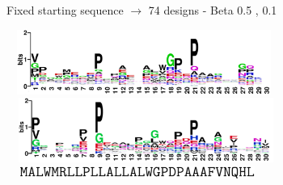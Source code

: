 \documentclass{beamer}
\begin{document}
% 
% 





\begin{frame}
\centering
Fixed starting sequence $\rightarrow$ 74 designs - Beta 0.5 , 0.1\\

\begin{adjustwidth}{-1.5em}{-2.5em}
\includegraphics[width=340px,height=80px]{../img/logo.png}\\ 
\includegraphics[width=345px,height=80px]{../img/logoBeta0-1.png}\\ 
\vspace{5px}
\hspace{18px}\includegraphics[width=324px,height=15px]{../img/sequence.png}
\end{adjustwidth}
\end{frame}
\end{document}

